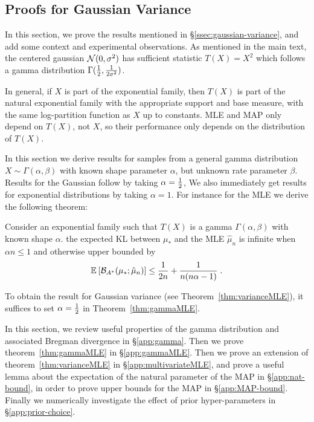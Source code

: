 \begin{subappendices}

\section{Proofs for Gaussian Variance}
\label{app:gaussian-variance}


In this section, we prove the results mentioned in \S\ref{ssec:gaussian-variance},
and add some context and experimental observations.
As mentioned in the main text, the centered gaussian ${\mathcal N}(0,\sigma^2)$ has sufficient statistic $T(X)=X^2$ which follows a gamma distribution $\Gamma(\frac{1}{2}, \frac{1}{2 \sigma^2})$. 

In general, if $X$ is part of the exponential family, then $T(X)$ is part of the natural exponential family with the appropriate support and base measure, with the same log-partition function as $X$ up to constants.
MLE and MAP only depend on $T(X)$, not $X$, so their performance only depends on the distribution of $T(X)$.
 
In this section we derive results for samples  from a general gamma distribution $X \sim \Gamma(\alpha,\beta)$ with known shape parameter $\alpha$, but unknown rate parameter $\beta$.
Results for the Gaussian follow by taking $\alpha=\frac{1}{2}$,
We also immediately get results for exponential distributions by taking $\alpha=1$.
For instance for the MLE we derive the following theorem:

\begin{theorem}
	\label{thm:gammaMLE}
	Consider an exponential family such that $T(X)$ is a gamma $\Gamma(\alpha, \beta)$ with known shape $\alpha$.
	the expected KL between $\mu_*$ and the MLE $\hat\mu_n$	is infinite when $\alpha n\leq 1$ and otherwise upper bounded by
	\begin{align}
		 \mathbb{E}_{} \left[ {\mathcal B}_{A^*}( \mu_*; \hat \mu_n)  \right] 
			\leq \frac{1}{2n} + \frac{1}{n(n \alpha-1)}  \; .
	\end{align}
\end{theorem}
	
To obtain the result for Gaussian variance (see Theorem~\ref{thm:varianceMLE}), it suffices to set $\alpha=\frac{1}{2}$ in Theorem~\ref{thm:gammaMLE}.

In this section, we review useful properties of the gamma distribution and associated Bregman divergence in \S\ref{app:gamma}. 
Then we prove theorem~\ref{thm:gammaMLE} in \S\ref{app:gammaMLE}.
Then we prove an extension of theorem~\ref{thm:varianceMLE} in \S\ref{app:multivariateMLE}, and prove a useful lemma about the expectation of the natural parameter of the MAP in \S\ref{app:nat-bound}, in order to prove upper bounds for the MAP in \S\ref{app:MAP-bound}.
Finally we numerically investigate the effect of prior hyper-parameters in \S\ref{app:prior-choice}.


\end{subappendices}
